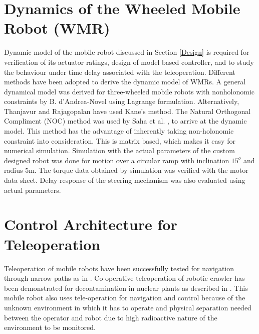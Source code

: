 \documentclass[12pt,a4paper, notitlepage]{article}
\begin{document}
	\section{Dynamics of the Wheeled Mobile Robot (WMR)}
	Dynamic model of the mobile robot discussed in Section \ref{Design} is required for verification of its actuator ratings, design of model based controller, and to study the  behaviour under time delay associated with the teleoperation.	 Different methods have  been adopted to derive the dynamic model of WMRs. A general dynamical model was derived for three-wheeled mobile robots with nonholonomic constraints  by B. d'Andrea-Novel \cite{d1991modelling} using  Lagrange formulation.	Alternatively, Thanjavur and Rajagopalan \cite{thanjavur1997ease} have used Kane's method. The  Natural Orthogonal Compliment (NOC) method was used by  Saha et al. \cite{saha1991dynamics}, \cite{saha1989kinematics}  to arrive at the dynamic model. This method has the advantage of inherently taking non-holonomic constraint into consideration. This is matrix based, which makes it easy for numerical simulation.  Simulation  with the actual parameters of the custom designed robot was done for  motion over a circular ramp with inclination $15^o$ and radius 5m. The torque data obtained by simulation was verified with the motor data sheet. Delay response of the steering mechanism was also evaluated using actual parameters.  
	
	\section{Control Architecture for Teleoperation}
	Teleoperation of mobile robots have been successfully tested for navigation through narrow paths as in \cite{du2018experimental}. Co-operative teleoperation of robotic crawler has been demonstrated for decontamination in nuclear plants as described in  \cite{senuma2017development}. This mobile robot also uses tele-operation for navigation and control because of the unknown environment in which it has to operate and physical separation needed between the operator and robot due to high radioactive nature of the environment to be monitored. 
	
\end{document}
